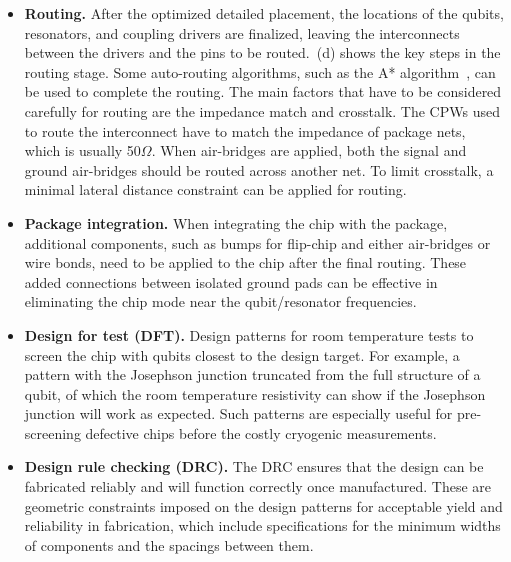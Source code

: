 \documentclass[a4paper,onecolumn,11pt,unpublished]{quantumarticle}
\begin{document}
\begin{itemize}
    \item \textbf{Routing.} After the optimized detailed placement, the locations of the qubits, resonators, and coupling drivers are finalized, leaving the interconnects between the drivers and the pins to be routed.~(d) shows the key steps in the routing stage.
    Some auto-routing algorithms, such as the A* algorithm~\cite{Hart1968A}, can be used to complete the routing. The main factors that have to be considered carefully for routing are the impedance match and crosstalk. The CPWs used to route the interconnect have to match the impedance of package nets, which is usually 50$\Omega$. When air-bridges are applied, both the signal and ground air-bridges should be routed across another net. To limit crosstalk, a minimal lateral distance constraint can be applied for routing.   
    \item \textbf{Package integration.} When integrating the chip with the package, additional components, such as bumps for flip-chip and either air-bridges or wire bonds, need to be applied to the chip after the final routing. These added connections between isolated ground pads can be effective in eliminating the chip mode near the qubit/resonator frequencies.  
    \item \textbf{Design for test (DFT).} Design patterns for room temperature tests to screen the chip with qubits closest to the design target. For example, a pattern with the Josephson junction truncated from the full structure of a qubit, of which the room temperature resistivity can show if the Josephson junction will work as expected. Such patterns are especially useful for pre-screening defective chips before the costly cryogenic measurements. 
    \item \textbf{Design rule checking (DRC).} The DRC ensures that the design can be fabricated reliably and will function correctly once manufactured. These are geometric constraints imposed on the design patterns for acceptable yield and reliability in fabrication, which include specifications for the minimum widths of components and the spacings between them.
\end{itemize}
\end{document}
